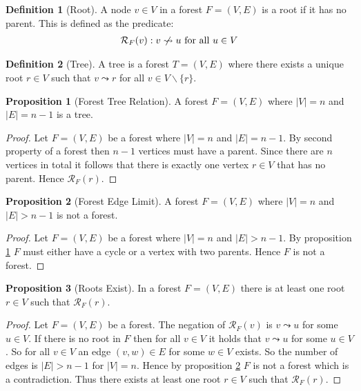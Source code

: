 \documentclass[a4paper,12pt]{article}
\theoremstyle{definition}
\newtheorem{definition}{Definition}[section]
\newtheorem{proposition}{Proposition}[section]
\begin{document}
\begin{definition}[Root]
    A node $v \in V$ in a forest $F = (V, E)$ is a root if it has no parent.
    This is defined as the predicate:
    \begin{align*}
        \mathcal{R}_F(v) : v \centernot\leadsto u \text{ for all } u \in V
    \end{align*}
\end{definition}

\begin{definition}[Tree]
    A tree is a forest $T = (V, E)$ where there exists a unique root $r \in V$
    such that $v \leadsto r$ for all $v \in V\backslash
    \{r\}$.
\end{definition}

\begin{proposition}[Forest Tree Relation]\label{prop:forest-tree}
    A forest $F = (V, E)$ where $|V| = n$ and $|E| = n - 1$ is a tree.
\end{proposition}

\begin{proof}
    Let $F = (V, E)$ be a forest where $|V| = n$ and $|E| = n - 1$. By second property of a forest then $n - 1$ vertices must have a parent. Since there are $n$ vertices in total it follows that there is exactly one vertex $r \in V$ that has no parent. Hence $\mathcal{R}_F(r)$. 
\end{proof}

\begin{proposition}[Forest Edge Limit]\label{prop:forest-edge-limit}
    A forest $F = (V, E)$ where $|V| = n$ and $|E| > n - 1$ is not a forest.
\end{proposition}

\begin{proof}
    Let $F = (V, E)$ be a forest where $|V| = n$ and $|E| > n - 1$. By
    proposition \ref{prop:forest-tree} $F$ must either have a cycle or a vertex
    with two parents. Hence $F$ is not a forest.
\end{proof}

\begin{proposition}[Roots Exist]
    In a forest $F = (V, E)$ there is at least one root $r \in V$ such that
    $\mathcal{R}_F(r)$.
\end{proposition}

\begin{proof}
    Let $F = (V, E)$ be a forest. The negation of $\mathcal{R}_F(v)$ is $v
    \leadsto u$ for some $u \in V$. If there is no root in $F$ then for all $v
    \in V$ it holds that $v \leadsto u$ for some $u \in V$. So for all $v \in V$
    an edge $(v, w) \in E$ for some $w \in V$ exists. So the number of edges is
    $|E| > n - 1$ for $|V| = n$. Hence by proposition
    \ref{prop:forest-edge-limit} $F$ is not a forest which is a contradiction.
    Thus there exists at least one root $r \in V$ such that $\mathcal{R}_F(r)$.
\end{proof}
\end{document}
